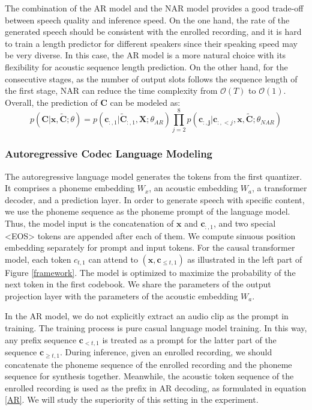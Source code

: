 \documentclass{article}
\theoremstyle{plain}
\theoremstyle{definition}
\theoremstyle{remark}
\begin{document}
The combination of the AR model and the NAR model provides a good trade-off between speech quality and inference speed. On the one hand, the rate of the generated speech should be consistent with the enrolled recording, and it is hard to train a length predictor for different speakers since their speaking speed may be very diverse. In this case, the AR model is a more natural choice with its flexibility for acoustic sequence length prediction. On the other hand, for the consecutive stages, as the number of output slots follows the sequence length of the first stage, NAR can reduce the time complexity from $\mathcal{O}(T)$ to $\mathcal{O}(1)$. Overall, the prediction of $\mathbf{C}$ can be modeled as: 
\begin{equation}
    p(\mathbf{C}|\mathbf{x}, \mathbf{\tilde{C}}; \theta) = 
    p(\mathbf{c}_{:, 1}| \mathbf{\tilde{C}}_{:,1}, \mathbf{X};\theta_{AR}) 
    \prod_{j=2}^{8}p(\mathbf{c_{:, j}}|\mathbf{c}_{:, <j},\mathbf{x}, \mathbf{\tilde{C}}; \theta_{NAR})
\end{equation}

\subsubsection{Autoregressive Codec Language Modeling}
The autoregressive language model generates the tokens from the first quantizer. It comprises a phoneme embedding $W_x$, an acoustic embedding $W_a$, a transformer decoder, and a prediction layer. In order to generate speech with specific content, we use the phoneme sequence as the phoneme prompt of the language model. Thus, the model input is the concatenation of $\mathbf{x}$ and $\mathbf{c}_{:,1}$, and two special <EOS> tokens are appended after each of them. 
We compute sinuous position embedding separately for prompt and input tokens. For the causal transformer model, each token $c_{t,1}$ can attend to $(\mathbf{x}, \mathbf{c}_{\leq t,1})$ as illustrated in the left part of Figure \ref{framework}. The model is optimized to  maximize the probability of the next token in the first codebook. We share  the parameters of the output projection layer with the parameters of the acoustic embedding $W_a$.
 
In the AR model, we do not explicitly extract an audio clip as the prompt in training. The training process is pure casual language model training. In this way, any prefix sequence $\mathbf{c}_{<t,1}$ is treated as a prompt for the latter part of the sequence $\mathbf{c}_{\ge t, 1}$.  During inference, given an enrolled recording, we should concatenate the phoneme sequence of the enrolled recording and the phoneme sequence for synthesis together. Meanwhile, the acoustic token sequence of the enrolled recording is used as the prefix in AR decoding, as formulated in equation \ref{AR}. We will study the superiority of this setting in the experiment. 
\end{document}
